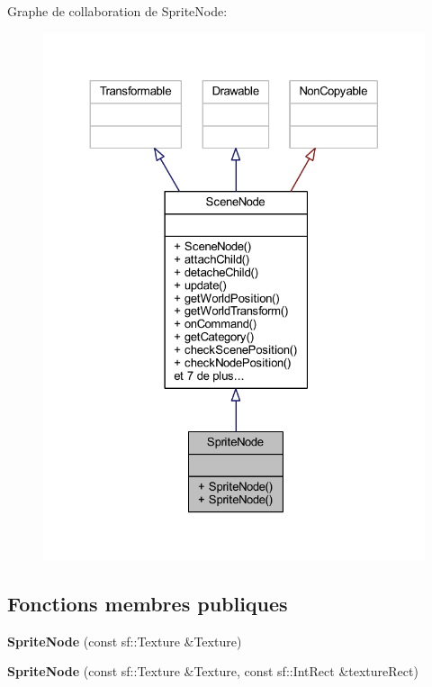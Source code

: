 Graphe de collaboration de Sprite\+Node\+:\nopagebreak
\begin{figure}[H]
\begin{center}
\leavevmode
\includegraphics[width=324pt]{class_sprite_node__coll__graph}
\end{center}
\end{figure}
\subsection*{Fonctions membres publiques}
\begin{DoxyCompactItemize}
\item 
\hypertarget{class_sprite_node_a1e6e5c71881a9ec2ddf9d0640f15e6a6}{}\label{class_sprite_node_a1e6e5c71881a9ec2ddf9d0640f15e6a6} 
{\bfseries Sprite\+Node} (const sf\+::\+Texture \&Texture)
\item 
\hypertarget{class_sprite_node_a6e047c482342a3dad1193097f0e1d125}{}\label{class_sprite_node_a6e047c482342a3dad1193097f0e1d125} 
{\bfseries Sprite\+Node} (const sf\+::\+Texture \&Texture, const sf\+::\+Int\+Rect \&texture\+Rect)
\end{DoxyCompactItemize}
